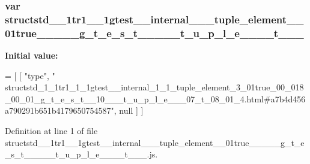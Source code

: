 \subsubsection[{\texorpdfstring{structstd\+\_\+1\+\_\+1tr1\+\_\+1\+\_\+1gtest\+\_\+\+\_\+internal\+\_\+1\+\_\+1\+\_\+tuple\+\_\+element\+\_\+3\+\_\+01true\+\_\+00\+\_\+018\+\_\+00\+\_\+01\+\_\+g\+\_\+t\+\_\+e\+\_\+s\+\_\+t\+\_\+\+\_\+10\+\_\+\+\_\+\+\_\+t\+\_\+u\+\_\+p\+\_\+l\+\_\+e\+\_\+\+\_\+\+\_\+07\+\_\+t\+\_\+08\+\_\+01\+\_\+4}{structstd_1_1tr1_1_1gtest__internal_1_1_tuple_element_3_01true_00_018_00_01_g_t_e_s_t__10___t_u_p_l_e___07_t_08_01_4}}]{\setlength{\rightskip}{0pt plus 5cm}var structstd\+\_\+\_\+1tr1\+\_\+\_\+1gtest\+\_\+\+\_\+internal\+\_\+\_\+\_\+tuple\+\_\+element\+\_\+\_\+01true\+\_\+\_\+\_\+\_\+\_\+g\+\_\+t\+\_\+e\+\_\+s\+\_\+t\+\_\+\+\_\+\_\+\+\_\+\+\_\+t\+\_\+u\+\_\+p\+\_\+l\+\_\+e\+\_\+\+\_\+\+\_\+\_\+t\+\_\+\_\+\_}\hypertarget{structstd__1__1tr1__1__1gtest____internal__1__1__tuple__element__3__01true__00__018__00__01__g__a74e18a6d4e370ede3173ed5f2b11568_a87ac352ad9b4b03b4b9339a015bf7554}{}\label{structstd__1__1tr1__1__1gtest____internal__1__1__tuple__element__3__01true__00__018__00__01__g__a74e18a6d4e370ede3173ed5f2b11568_a87ac352ad9b4b03b4b9339a015bf7554}
{\bfseries Initial value\+:}
\begin{DoxyCode}
=
[
    [ \textcolor{stringliteral}{"type"}, \textcolor{stringliteral}{"
      structstd\_1\_1tr1\_1\_1gtest\_\_internal\_1\_1\_tuple\_element\_3\_01true\_00\_018\_00\_01\_g\_t\_e\_s\_t\_\_10\_\_\_t\_u\_p\_l\_e\_\_\_07\_t\_08\_01\_4.html#a7b4d456a790291b651b4179650754587"}, null ]
]
\end{DoxyCode}


Definition at line 1 of file structstd\+\_\+\_\+1tr1\+\_\+\_\+1gtest\+\_\+\+\_\+internal\+\_\+\_\+\_\+tuple\+\_\+element\+\_\+\_\+01true\+\_\+\_\+\_\+\_\+\_\+g\+\_\+t\+\_\+e\+\_\+s\+\_\+t\+\_\+\+\_\+\_\+\+\_\+\+\_\+t\+\_\+u\+\_\+p\+\_\+l\+\_\+e\+\_\+\+\_\+\+\_\+\_\+t\+\_\+\_\+\_.\+js.

